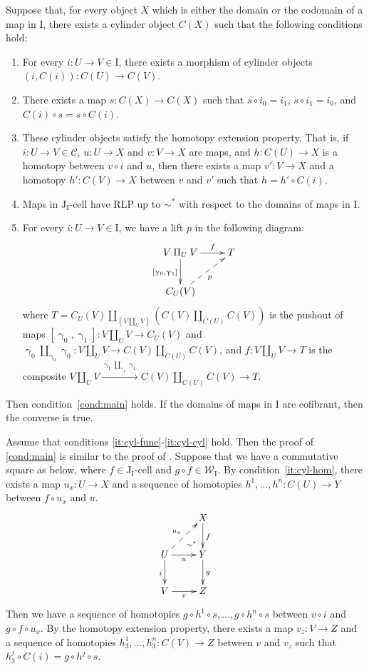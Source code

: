\documentclass{tac}
\theoremstyle{definition}
\newcommand{\we}{\mathcal{W}}
\newcommand{\cof}{\mathcal{C}}
\newcommand{\I}{\mathrm{I}}
\newcommand{\J}{\mathrm{J}}
\newcommand{\class}[2]{#1\text{-}\mathrm{#2}}
\newcommand{\Icell}[1][\I]{\class{#1}{cell}}
\newcommand{\Jcell}[1][]{\Icell[\J#1]}
\newcommand{\cyli}{\upgamma}
\begin{document}
\begin{prop}
Suppose that, for every object $X$ which is either the domain or the codomain of a map in $\I$,
there exists a cylinder object $C(X)$ such that the following conditions hold:
\begin{enumerate}
\item \label{it:cyl-func} For every $i : U \to V \in \I$, there exists a morphism of cylinder objects $(i,C(i)) : C(U) \to C(V)$.
\item There exists a map $s : C(X) \to C(X)$ such that $s \circ i_0 = i_1$, $s \circ i_1 = i_0$, and $C(i) \circ s = s \circ C(i)$.
\item These cylinder objects satisfy the homotopy extension property. That is,
if $i : U \to V \in \cof$, $u : U \to X$ and $v : V \to X$ are maps, and $h : C(U) \to X$ is a homotopy between $v \circ i$ and $u$,
then there exists a map $v' : V \to X$ and a homotopy $h' : C(V) \to X$ between $v$ and $v'$ such that $h = h' \circ C(i)$.
\item \label{it:cyl-hom} Maps in $\Jcell[_\I]$ have RLP up to $\sim^*$ with respect to the domains of maps in $\I$.
\item \label{it:cyl-cyl} For every $i : U \to V \in \I$, we have a lift $p$ in the following diagram:
\[ \xymatrix{ V \amalg_U V \ar[r]^-f \ar[d]_{[\cyli_0,\cyli_1]} & T \\
              C_U(V) \ar@{-->}[ur]_p
            } \]
where $T = C_U(V) \amalg_{(V \amalg_U V)} (C(V) \amalg_{C(U)} C(V))$ is the pushout of maps $[\cyli_0,\cyli_1] : V \amalg_U V \to C_U(V)$
and $\cyli_0 \amalg_{\cyli_0} \cyli_0 : V \amalg_U V \to C(V) \amalg_{C(U)} C(V)$,
and $f : V \amalg_U V \to T$ is the composite $V \amalg_U V \xrightarrow{\cyli_1 \amalg_{\cyli_1} \cyli_1} C(V) \amalg_{C(U)} C(V) \to T$.
\end{enumerate}
Then condition~\eqref{cond:main} holds.
If the domains of maps in $\I$ are cofibrant, then the converse is true.
\end{prop}
\proof
Assume that conditions \eqref{it:cyl-func}-\eqref{it:cyl-cyl} hold.
Then the proof of \eqref{cond:main} is similar to the proof of .
Suppose that we have a commutative square as below, where $f \in \Jcell[_\I]$ and $g \circ f \in \we_\I$.
By condition~\eqref{it:cyl-hom}, there exists a map $u_x : U \to X$ and a sequence of homotopies $h^1, \ldots, h^n : C(U) \to Y$ between $f \circ u_x$ and $u$.
\[ \xymatrix{   \ar@{}[dr]|(.7){\sim^*}               & X \ar[d]^f \\
              U \ar@{-->}[ur]^{u_x} \ar[d]_i \ar[r]_u & Y \ar[d]^g \\
              V \ar[r]_v                              & Z
            } \]
Then we have a sequence of homotopies $g \circ h^1 \circ s, \ldots, g \circ h^n \circ s$ between $v \circ i$ and $g \circ f \circ u_x$.
By the homotopy extension property, there exists a map $v_z : V \to Z$ and a sequence of homotopies $h^1_3, \ldots, h^n_3 : C(V) \to Z$ between $v$ and $v_z$ such that $h^j_3 \circ C(i) = g \circ h^j \circ s$.
\end{document}
